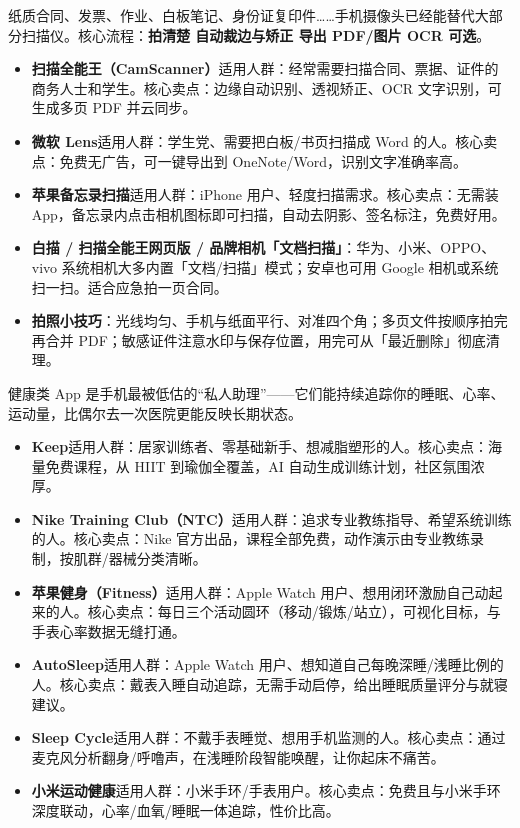 
纸质合同、发票、作业、白板笔记、身份证复印件……手机摄像头已经能替代大部分扫描仪。核心流程：\textbf{拍清楚 自动裁边与矫正 导出 PDF/图片 OCR 可选}。

\begin{itemize}
  \item \textbf{扫描全能王（CamScanner）}适用人群：经常需要扫描合同、票据、证件的商务人士和学生。核心卖点：边缘自动识别、透视矫正、OCR 文字识别，可生成多页 PDF 并云同步。
  \item \textbf{微软 Lens}适用人群：学生党、需要把白板/书页扫描成 Word 的人。核心卖点：免费无广告，可一键导出到 OneNote/Word，识别文字准确率高。
  \item \textbf{苹果备忘录扫描}适用人群：iPhone 用户、轻度扫描需求。核心卖点：无需装 App，备忘录内点击相机图标即可扫描，自动去阴影、签名标注，免费好用。
  \item \textbf{白描 / 扫描全能王网页版 / 品牌相机「文档扫描」}：华为、小米、OPPO、vivo 系统相机大多内置「文档/扫描」模式；安卓也可用 Google 相机或系统扫一扫。适合应急拍一页合同。
  \item \textbf{拍照小技巧}：光线均匀、手机与纸面平行、对准四个角；多页文件按顺序拍完再合并 PDF；敏感证件注意水印与保存位置，用完可从「最近删除」彻底清理。
\end{itemize}


健康类 App 是手机最被低估的“私人助理”——它们能持续追踪你的睡眠、心率、运动量，比偶尔去一次医院更能反映长期状态。


\begin{itemize}
  \item \textbf{Keep}适用人群：居家训练者、零基础新手、想减脂塑形的人。核心卖点：海量免费课程，从 HIIT 到瑜伽全覆盖，AI 自动生成训练计划，社区氛围浓厚。
  \item \textbf{Nike Training Club（NTC）}适用人群：追求专业教练指导、希望系统训练的人。核心卖点：Nike 官方出品，课程全部免费，动作演示由专业教练录制，按肌群/器械分类清晰。
  \item \textbf{苹果健身（Fitness）}适用人群：Apple Watch 用户、想用闭环激励自己动起来的人。核心卖点：每日三个活动圆环（移动/锻炼/站立），可视化目标，与手表心率数据无缝打通。
\end{itemize}


\begin{itemize}
  \item \textbf{AutoSleep}适用人群：Apple Watch 用户、想知道自己每晚深睡/浅睡比例的人。核心卖点：戴表入睡自动追踪，无需手动启停，给出睡眠质量评分与就寝建议。
  \item \textbf{Sleep Cycle}适用人群：不戴手表睡觉、想用手机监测的人。核心卖点：通过麦克风分析翻身/呼噜声，在浅睡阶段智能唤醒，让你起床不痛苦。
  \item \textbf{小米运动健康}适用人群：小米手环/手表用户。核心卖点：免费且与小米手环深度联动，心率/血氧/睡眠一体追踪，性价比高。
\end{itemize}

